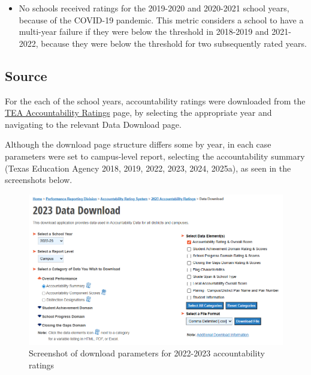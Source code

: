 \documentclass[
  letterpaper,
  DIV=11,
  numbers=noendperiod]{scrreprt}
\providecommand{\tightlist}{%
  \setlength{\itemsep}{0pt}\setlength{\parskip}{0pt}}
\begin{document}
\begin{itemize}
\tightlist
\item
  No schools received ratings for the 2019-2020 and 2020-2021 school
  years, because of the COVID-19 pandemic. This metric considers a
  school to have a multi-year failure if they were below the threshold
  in 2018-2019 and 2021-2022, because they were below the threshold for
  two subsequently rated years.
\end{itemize}

\subsection{Source}\label{source-1}

For the each of the school years, accountability ratings were downloaded
from the
\href{https://rptsvr1.tea.texas.gov/perfreport/account/index.html}{TEA
Accountability Ratings} page, by selecting the appropriate year and
navigating to the relevant Data Download page.

Although the download page structure differs some by year, in each case
parameters were set to campus-level report, selecting the accountability
summary (Texas Education Agency 2018, 2019, 2022, 2023, 2024, 2025a), as
seen in the screenshots below.

\begin{figure}[H]

{\centering \includegraphics[width=6.25in,height=\textheight,keepaspectratio]{visuals/2023_accountability_screenshot.png}

}

\caption{Screenshot of download parameters for 2022-2023 accountability
ratings}

\end{figure}%
\end{document}
